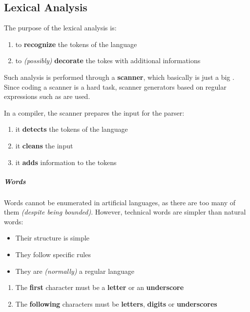 \documentclass[english]{article}
\begin{document}
\subsection{Lexical Analysis}

The purpose of the lexical analysis is:

\begin{enumerate}
  \item to \textbf{recognize} the tokens of the language
  \item to \textit{(possibly)} \textbf{decorate} the tokes with additional informations
\end{enumerate}

Such analysis is performed through a \textbf{scanner}, which basically is just a big \FSA.
Since coding a scanner is a hard task, scanner generators based on regular expressions such as \flex are used.

In a compiler, the scanner prepares the input for the parser:

\begin{enumerate}
  \item it \textbf{detects} the tokens of the language
  \item it \textbf{cleans} the input
  \item it \textbf{adds} information to the tokens
\end{enumerate}

\subparagraph*{Words}
Words cannot be enumerated in artificial languages, as there are too many of them \textit{(despite being bounded)}.
However, technical words are simpler than natural words:

\begin{itemize}
  \item Their structure is simple
  \item They follow specific rules
  \item They are \textit{(normally)} a regular language
\end{itemize}

\begin{property}
  \label{prop:c-identifiers}
  \hfill
  \begin{enumerate}
    \item The \textbf{first} character must be a \textbf{letter} or an \textbf{underscore}
    \item The \textbf{following} characters must be \textbf{letters}, \textbf{digits} or \textbf{underscores}
  \end{enumerate}
\end{property}
\end{document}
